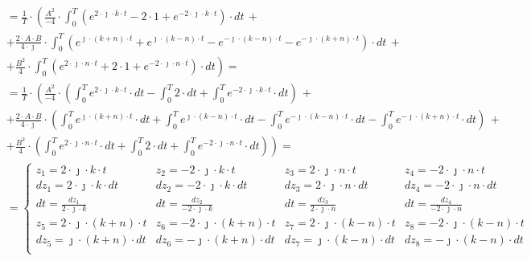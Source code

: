 \begin{task}
\begin{align*}
&=\frac{1}{T} \cdot \left( \frac{A^2}{-4}\cdot \int_{0}^{T} \left(e^{2\cdot \jmath \cdot k \cdot t}-2\cdot 1 +e^{-2\cdot \jmath \cdot k \cdot t}\right) \cdot dt \,+\right. \\
&+ \left. \frac{2 \cdot A\cdot B}{4 \cdot \jmath} \cdot \int_{0}^{T} \left( e^{\jmath \cdot \left(k+n\right) \cdot t} + e^{\jmath \cdot \left(k-n\right) \cdot t} - e^{-\jmath \cdot \left(k-n\right) \cdot t} - e^{-\jmath \cdot \left(k+n\right) \cdot t}\right) \cdot dt\,+\right.\\
&+ \left. \frac{B^2}{4} \cdot \int_{0}^{T} \left( e^{2\cdot \jmath \cdot n \cdot t}+2\cdot 1 +e^{-2\cdot \jmath \cdot n \cdot t}\right) \cdot dt \right)=\\
&=\frac{1}{T} \cdot \left( \frac{A^2}{-4}\cdot \left( \int_{0}^{T} e^{2\cdot \jmath \cdot k \cdot t}\cdot dt-\int_{0}^{T} 2 \cdot dt +\int_{0}^{T} e^{-2\cdot \jmath \cdot k \cdot t} \cdot dt \right) \,+\right. \\
&+ \left. \frac{2 \cdot A\cdot B}{4 \cdot \jmath} \cdot \left( \int_{0}^{T} e^{\jmath \cdot \left(k+n\right) \cdot t}\cdot dt + \int_{0}^{T} e^{\jmath \cdot \left(k-n\right) \cdot t}\cdot dt - \int_{0}^{T} e^{-\jmath \cdot \left(k-n\right) \cdot t}\cdot dt - \int_{0}^{T} e^{-\jmath \cdot \left(k+n\right) \cdot t} \cdot dt \right)\,+\right.\\
&+ \left. \frac{B^2}{4} \cdot \left( \int_{0}^{T} e^{2\cdot \jmath \cdot n \cdot t}\cdot dt+\int_{0}^{T}2\cdot dt +\int_{0}^{T} e^{-2\cdot \jmath \cdot n \cdot t} \cdot dt\right) \right)=\\
&=\left\{\begin{array}{llll}
z_1=2\cdot \jmath \cdot k \cdot t & z_2=-2\cdot \jmath \cdot k \cdot t & z_3=2\cdot \jmath \cdot n \cdot t & z_4=-2\cdot \jmath \cdot n \cdot t \\
dz_1=2\cdot \jmath \cdot k \cdot dt & dz_2=-2\cdot \jmath \cdot k \cdot dt & dz_3=2\cdot \jmath \cdot n \cdot dt & dz_4=-2\cdot \jmath \cdot n \cdot dt \\
dt=\frac{dz_1}{2\cdot \jmath \cdot k} & dt =\frac{dz_2}{-2\cdot \jmath \cdot k} & dt=\frac{dz_3}{2\cdot \jmath \cdot n} & dt =\frac{dz_4}{-2\cdot \jmath \cdot n} \\
z_5=2\cdot \jmath \cdot \left(k+n\right) \cdot t & z_6=-2\cdot \jmath \cdot \left(k+n\right) \cdot t & z_7=2\cdot \jmath \cdot \left(k-n\right) \cdot t & z_8=-2\cdot \jmath \cdot \left(k-n\right) \cdot t \\
dz_5=\jmath \cdot \left(k+n\right) \cdot dt & dz_6=-\jmath \cdot \left(k+n\right) \cdot dt & dz_7=\jmath \cdot \left(k-n\right) \cdot dt & dz_8=-\jmath \cdot \left(k-n\right) \cdot dt \\

\end{array}
\end{align*}
\end{task}
